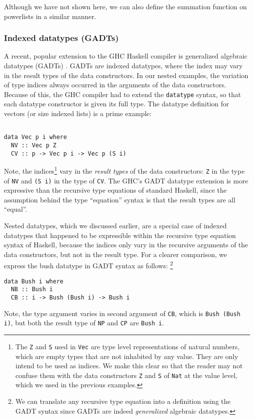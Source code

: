 \documentclass[letterpaper,12pt]{article}
\begin{document}
Although we have not shown here, we can also define the summation function on
powerlists in a similar manner.


\subsubsection{Indexed datatypes (GADTs)} \label{sec:bg:nonreg:indexed}

A recent, popular extension to the GHC Haskell compiler is
generalized algebraic datatypes (GADTs) \cite{She05}.
GADTs are indexed datatypes, where the index may vary in the result types of
the data constructors. In our nested examples, the variation of type indices
always occurred in the arguments of the data constructors. Because of this,
the GHC compiler had to extend the \verb|datatype| syntax, so that each datatype
constructor is given its full type. The datatype definition for vectors
(or size indexed lists) is a prime example:
\begin{verbatim}

data Vec p i where
  NV :: Vec p Z
  CV :: p -> Vec p i -> Vec p (S i)
\end{verbatim}
Note, the indices\footnote{The \texttt{Z} and \texttt{S} used in \texttt{Vec} are type level
representations of natural numbers, which are empty types that are not
inhabited by any value. They are only intend to be used as indices.
We make this clear so that the reader may not confuse them with
the data constructors \texttt{Z} and \texttt{S} of \texttt{Nat} at the value level,
which we used in the previous examples.} vary in the \emph{result types} of
the data constructors: \texttt{Z} in the type of \texttt{NV} and \texttt{(S i)} in the type of \texttt{CV}.
The GHC's GADT datatype extension is more expressive than the recursive type
equations of standard Haskell, since the assumption behind the type ``equation''
syntax is that the result types are all ``equal''.

Nested datatypes, which we discussed earlier, are a special case of
indexed datatypes that happened to be expressible within
the recursive type equation syntax of Haskell, because the indices only vary
in the recursive arguments of the data constructors, but not in the result type.
For a clearer comparison, we express the bush datatype in GADT syntax as
follows: \footnote{We can translate any recursive type equation into
a definition using the GADT syntax since GADTs are indeed \emph{generalized}
algebraic datatypes.}

\begin{verbatim}
data Bush i where
  NB :: Bush i
  CB :: i -> Bush (Bush i) -> Bush i
\end{verbatim}
Note, the type argument varies in second argument of \verb|CB|,
which is \verb|Bush (Bush i)|, but both the result type of
\verb|NP| and \verb|CP| are \verb|Bush i|.
\end{document}
